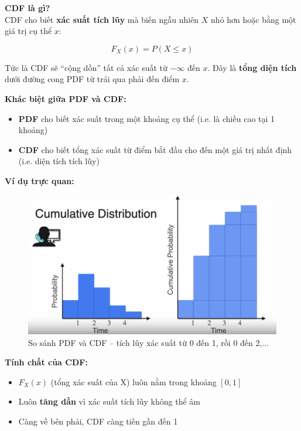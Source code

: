 \documentclass[11pt]{article}
\begin{document}
\vspace{1em}

\textbf{CDF là gì?} \\

CDF cho biết \textbf{xác suất tích lũy} mà biến ngẫu nhiên $X$ nhỏ hơn hoặc bằng một giá trị cụ thể $x$:

\[
F_X(x) = P(X \leq x)
\]

Tức là CDF sẽ “cộng dồn” tất cả xác suất từ $-\infty$ đến $x$. Đây là \textbf{tổng diện tích} dưới đường cong PDF từ trái qua phải đến điểm $x$.

\vspace{1em}

\textbf{Khác biệt giữa PDF và CDF:}
\begin{itemize}
    \item \textbf{PDF} cho biết xác suất trong một khoảng cụ thể (i.e. là chiều cao tại 1 khoảng)
    \item \textbf{CDF} cho biết tổng xác suất từ điểm bắt đầu cho đến một giá trị nhất định (i.e. diện tích tích lũy)
\end{itemize}

\textbf{Ví dụ trực quan:}

\begin{figure}[H]
    \centering
    \includegraphics[width=0.8\linewidth]{images/pdf2cmf.png}
    \caption{So sánh PDF và CDF – tích lũy xác suất từ 0 đến 1, rồi 0 đến 2,...}
\end{figure}

\vspace{0.5em}

\textbf{Tính chất của CDF:}
\begin{itemize}
    \item $F_X(x)$ (tổng xác suất của X) luôn nằm trong khoảng $[0, 1]$
    \item Luôn \textbf{tăng dần} vì xác suất tích lũy không thể âm
    \item Càng về bên phải, CDF càng tiến gần đến 1
\end{itemize}
\end{document}
